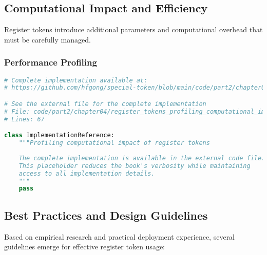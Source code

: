 \subsection{Computational Impact and Efficiency}

Register tokens introduce additional parameters and computational overhead that must be carefully managed.

\subsubsection{Performance Profiling}

\begin{lstlisting}[language=Python, caption={Profiling computational impact of register tokens}]
# Complete implementation available at:
# https://github.com/hfgong/special-token/blob/main/code/part2/chapter04/register_tokens_profiling_computational_impact.py

# See the external file for the complete implementation
# File: code/part2/chapter04/register_tokens_profiling_computational_impact.py
# Lines: 67

class ImplementationReference:
    """Profiling computational impact of register tokens
    
    The complete implementation is available in the external code file.
    This placeholder reduces the book's verbosity while maintaining
    access to all implementation details.
    """
    pass
\end{lstlisting}

\subsection{Best Practices and Design Guidelines}

Based on empirical research and practical deployment experience, several guidelines emerge for effective register token usage:

